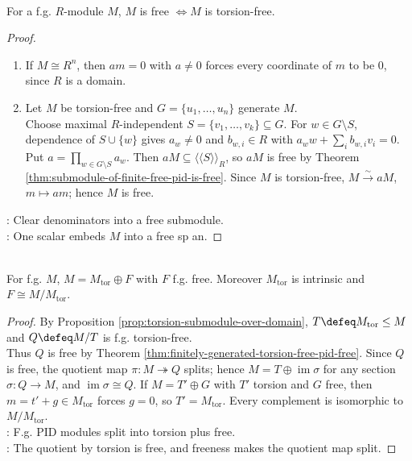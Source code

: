 \begin{theorem} \label{thm:finitely-generated-torsion-free-pid-free} \\
For a f.g. $R$-module $M$, $M$ is free $\iff M$ is torsion-free.
\begin{proof}
\begin{enumerate}[label=\roman*.]
\setlength{\itemsep}{0pt}
\item[$(\Rightarrow)$] If $M\cong R^n$, then $am=0$ with $a\neq0$ forces every coordinate of $m$ to be $0$, since $R$ is a domain.
\item[$(\Leftarrow)$] Let $M$ be torsion-free and $G=\{u_1,\ldots,u_n\}$ generate $M$.\\
Choose maximal $R$-independent $S=\{v_1,\ldots,v_k\}\subseteq G$. For $w\in G\setminus S$, dependence of $S\cup\{w\}$ gives $a_w\neq0$ and $b_{w,i}\in R$ with $a_ww+\sum\limits_i b_{w,i}v_i=0$. Put $a=\prod_{w\in G\setminus S}a_w$. Then $aM\subseteq\langle\!\langle S\rangle\!\rangle_R$, so $aM$ is free by Theorem \ref{thm:submodule-of-finite-free-pid-is-free}. Since $M$ is torsion-free, $M\xrightarrow{\sim}aM$, $m\mapsto am$; hence $M$ is free.
\end{enumerate}
\noindent
{}: Clear denominators into a free submodule.\\
: One scalar embeds $M$ into a free sp	an.
\end{proof}
\end{theorem}

\begin{theorem} \label{thm:finitely-generated-pid-free-plus-torsion} \\
For f.g. $M$, $M=M_{\operatorname{tor}}\oplus F$ with $F$ f.g. free. Moreover $M_{\operatorname{tor}}$ is intrinsic and $F\cong M/M_{\operatorname{tor}}$.
\begin{proof} By Proposition \ref{prop:torsion-submodule-over-domain}, $T\defeq M_{\operatorname{tor}}\leq M$ and $Q\defeq M/T$ is f.g. torsion-free.\\
Thus $Q$ is free by Theorem \ref{thm:finitely-generated-torsion-free-pid-free}. Since $Q$ is free, the quotient map $\pi:M\twoheadrightarrow Q$ splits; hence $M=T\oplus\operatorname{im}\sigma$ for any section $\sigma:Q\to M$, and $\operatorname{im}\sigma\cong Q$. If $M=T'\oplus G$ with $T'$ torsion and $G$ free, then $m=t'+g\in M_{\operatorname{tor}}$ forces $g=0$, so $T'=M_{\operatorname{tor}}$. Every complement is isomorphic to $M/M_{\operatorname{tor}}$.\\
: F.g. PID modules split into torsion plus free.\\
: The quotient by torsion is free, and freeness makes the quotient map split.
\end{proof}
\end{theorem}

